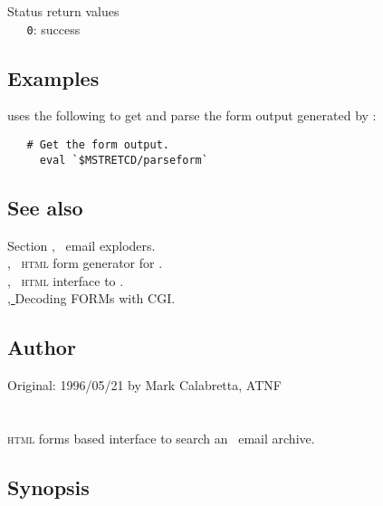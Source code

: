 Status return values
\\ \verb+   0+: success

\subsection*{Examples}

 uses the following to get and parse the form output generated
by :

\begin{verbatim}
   # Get the form output.
     eval `$MSTRETCD/parseform`
\end{verbatim}
 
\subsection*{See also}
 
Section , \aipspp\ email exploders.\\
, \aipspp\ \textsc{html} form generator for .\\
, \aipspp\ \textsc{html} interface to .\\
\href{http://hoohoo.ncsa.uiuc.edu/cgi/forms.html}{, }
   {Decoding FORMs with CGI}.
 
\subsection*{Author}
 
Original: 1996/05/21 by Mark Calabretta, ATNF


\newpage
\section{}
\label{pickhtml}

\textsc{html} forms based interface to search an \aipspp\ email archive.

\subsection*{Synopsis}

\begin{synopsis}
\end{synopsis}

